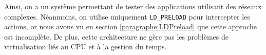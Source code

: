 Ainsi, on a un système permettant de tester des applications utilisant des
réseaux complexes. Néanmoins, on utilise uniquement \texttt{LD\_PRELOAD} pour
intercepter les actions, or nous avons vu en section \ref{paragraphe:LDPreload}
que cette approche est incomplète. De plus, cette architecture ne gère pas les
problèmes de virtualisation liés au CPU et à la gestion du temps.




